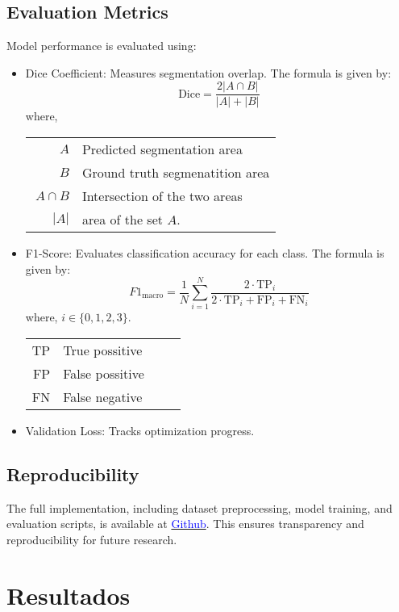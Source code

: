 \documentclass[journal]{IEEEtran}
\begin{document}
\subsection{Evaluation Metrics}
Model performance is evaluated using:
  \begin{itemize}
    \item Dice Coefficient: Measures segmentation overlap. The formula is given by:
    \[
    \text{Dice} = \frac{2|A\cap B|}{|A|+|B|}
    \]
    where, 
    \begin{center}
    \begin{tabular}{r@{\ :\ }p{0.8\linewidth}}
      $A$ & Predicted segmentation area\\
      $B$ & Ground truth segmenatition area\\
      $A\cap B$ & Intersection of the two areas\\
      $|A|$ & area of the set $A.$
    \end{tabular}
  \end{center}
    \item F1-Score: Evaluates classification accuracy for each class. The formula is given by:
    \[
    F1_{\text{macro}} = \frac{1}{N} \sum_{i=1}^{N} \frac{2 \cdot \text{TP}_i}{2 \cdot \text{TP}_i + \text{FP}_i + \text{FN}_i}
    \]
where, $i\in \{0,1,2,3\}.$
  \begin{center}
    \begin{tabular}{r@{\ :\ }p{0.8\linewidth}}
      TP & True possitive\\
      FP & False possitive\\
      FN & False negative\\
    \end{tabular}
  \end{center}
    \item Validation Loss: Tracks optimization progress.
  \end{itemize}

\subsection{Reproducibility}

The full implementation, including dataset preprocessing, model training, and evaluation scripts, is available at \href{https://github.com/evelyncueva/DeepLearningCourse.git}{\textcolor{blue}{Github}}. This ensures transparency and reproducibility for future research.

\section{Resultados}
\end{document}
